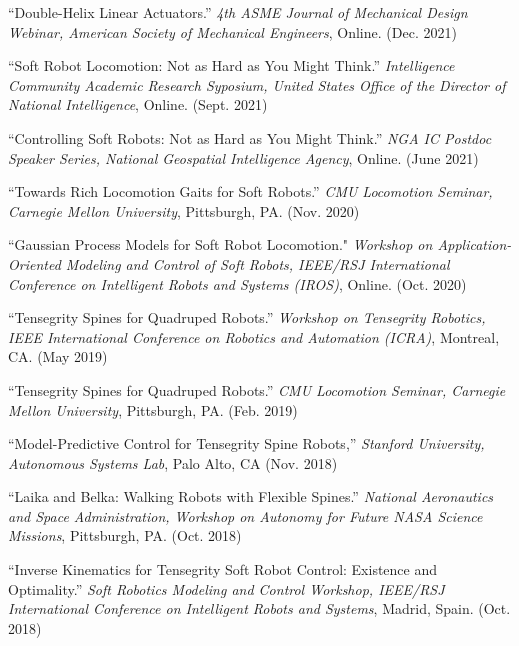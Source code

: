 \documentclass[letterpaper]{deedy-resume} %
\begin{document}
\begin{etaremune}[itemsep=0.1cm]

\item ``Double-Helix Linear Actuators.'' {\it 4th ASME Journal of Mechanical Design Webinar, American Society of Mechanical Engineers}, Online. (Dec. 2021)

\item ``Soft Robot Locomotion: Not as Hard as You Might Think.'' {\it Intelligence Community Academic Research Syposium, United States Office of the Director of National Intelligence}, Online. (Sept. 2021)

\item ``Controlling Soft Robots: Not as Hard as You Might Think.'' {\it NGA IC Postdoc Speaker Series, National Geospatial Intelligence Agency}, Online. (June 2021)

\item ``Towards Rich Locomotion Gaits for Soft Robots.'' {\it CMU Locomotion Seminar, Carnegie Mellon University}, Pittsburgh, PA. (Nov. 2020)

\item  ``Gaussian Process Models for Soft Robot Locomotion." {\it Workshop on Application-Oriented Modeling and Control of Soft Robots, IEEE/RSJ International Conference on Intelligent Robots and Systems (IROS)}, Online. (Oct. 2020)

\item ``Tensegrity Spines for Quadruped Robots.'' {\it Workshop on Tensegrity Robotics, IEEE International Conference on Robotics and Automation (ICRA)}, Montreal, CA. (May 2019)

\item ``Tensegrity Spines for Quadruped Robots.'' {\it CMU Locomotion Seminar, Carnegie Mellon University}, Pittsburgh, PA. (Feb. 2019)

\item ``Model-Predictive Control for Tensegrity Spine Robots,'' {\it Stanford University, Autonomous Systems Lab}, Palo Alto, CA (Nov. 2018)

\item ``Laika and Belka: Walking Robots with Flexible Spines.'' {\it National Aeronautics and Space Administration, Workshop on Autonomy for Future NASA Science Missions}, Pittsburgh, PA. (Oct. 2018)

\item ``Inverse Kinematics for Tensegrity Soft Robot Control: Existence and Optimality.'' {\it Soft Robotics Modeling and Control Workshop, IEEE/RSJ International Conference on Intelligent Robots and Systems}, Madrid, Spain. (Oct. 2018)


\end{etaremune}
\end{document}
